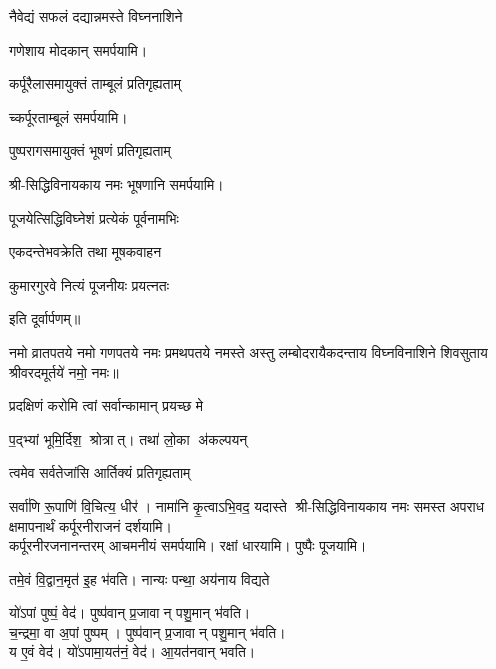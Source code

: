 \begin{center}
{नैवेद्यं सफलं दद्यान्नमस्ते विघ्ननाशिने} 
   
गणेशाय मोदकान् समर्पयामि।\medskip

{कर्पूरैलासमायुक्तं ताम्बूलं प्रतिगृह्यताम्}

च्कर्पूरताम्बूलं समर्पयामि।\medskip
      


{पुष्परागसमायुक्तं भूषणं प्रतिगृह्यताम्} 

श्री-सिद्धिविनायकाय नमः भूषणानि समर्पयामि।\medskip

{पूजयेत्सिद्धिविघ्नेशं प्रत्येकं पूर्वनामभिः} 

{एकदन्तेभवक्रेति तथा मूषकवाहन}

{कुमारगुरवे नित्यं पूजनीयः प्रयत्नतः}

इति दूर्वार्पणम्॥

नमो व्रातपतये नमो गणपतये नमः प्रमथपतये नमस्ते अस्तु लम्बोदरायैकदन्ताय विघ्नविनाशिने शिवसुताय श्रीवरदमू‍र्तये॑ नमो॒ नमः॥

{प्रदक्षिणं करोमि त्वां सर्वान्कामान् प्रयच्छ मे}

{प॒द्भ्यां भूमि॒र्दिश॒ श्रोत्रात्। तथा॑ लो॒का अ॑कल्पयन्}

{त्वमेव सर्वतेजांसि आर्तिक्यं प्रतिगृह्यताम्} 

{सर्वा॑णि रू॒पाणि॑ वि॒चित्य॒ धीर॑। नामा॑नि कृ॒त्वाऽभि॒वद॒\an{} यदास्ते}
श्री-सिद्धिविनायकाय नमः समस्त अपराध क्षमापनार्थं कर्पूरनीराजनं दर्शयामि।\\
कर्पूरनीरजनानन्तरम् आचमनीयं समर्पयामि। रक्षां धारयामि। पुष्पैः पूजयामि।
\medskip

{तमे॒वं वि॒द्वान॒मृत॑ इ॒ह भ॑वति। नान्यः पन्था॒ अय॑नाय विद्यते}

यो॑ऽपां पुष्पं॒ वेद॑। पुष्प॑वान् प्र॒जावान् पशु॒मान् भ॑वति।\\
च॒न्द्रमा॒ वा अ॒पां पुष्पम्। पुष्प॑वान् प्र॒जावान् पशु॒मान् भ॑वति।\\
य ए॒वं वेद॑। यो॑ऽपामा॒यत॑नं॒ वेद॑। आ॒यत॑नवान् भवति।\medskip


\end{center}
